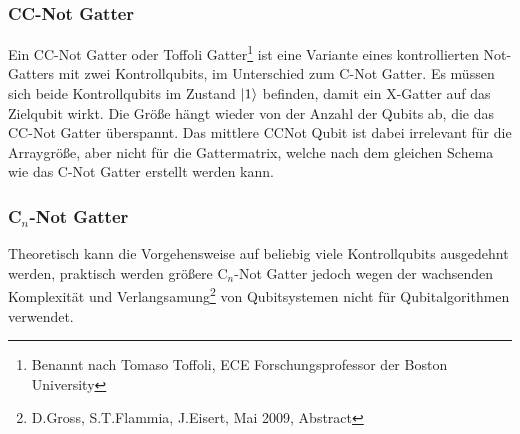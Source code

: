 \documentclass[12pt]{report}
\begin{document}
\subsubsection{CC-Not Gatter}			%
Ein CC-Not Gatter oder Toffoli Gatter\footnote{Benannt nach Tomaso Toffoli, \glqq ECE\grqq{} Forschungsprofessor der \glqq Boston University\grqq} ist eine Variante eines kontrollierten Not-Gatters mit zwei Kontrollqubits, im Unterschied zum C-Not Gatter. Es müssen sich beide Kontrollqubits im Zustand $\ket{1}$ befinden, damit ein X-Gatter auf das Zielqubit wirkt. Die Größe hängt wieder von der Anzahl der Qubits ab, die das CC-Not Gatter überspannt. Das mittlere CCNot Qubit ist dabei irrelevant für die Arraygröße, aber nicht für die Gattermatrix, welche nach dem gleichen Schema wie das C-Not Gatter erstellt werden kann.

\subsubsection{C$_{n}$-Not Gatter}
Theoretisch kann die Vorgehensweise auf beliebig viele Kontrollqubits ausgedehnt werden, praktisch werden größere C$_n$-Not Gatter jedoch wegen der wachsenden Komplexität und Verlangsamung\footnote{D.Gross, S.T.Flammia, J.Eisert, Mai 2009, Abstract} von Qubitsystemen nicht für Qubitalgorithmen verwendet.
\end{document}
